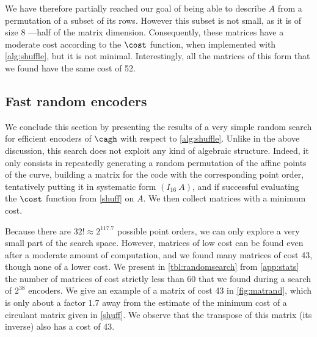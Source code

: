 We have therefore partially reached our goal of being able to describe $A$ from a permutation of a subset of its rows. However this subset
is not small, as it is of size 8 ---half
of the matrix dimension. Consequently, these matrices have a moderate cost according to the $\cost$ function, when implemented with \autoref{alg:shuffle}, but it is not minimal. Interestingly, all the matrices of this form
that we found have the same cost of 52.

\subsection{Fast random encoders}

We conclude this section by presenting the results of a very simple random search for efficient encoders of $\cagh$ with respect to \autoref{alg:shuffle}. Unlike
in the above discussion, this search does not exploit any kind of algebraic structure.
Indeed, it only consists in repeatedly generating a random permutation of the affine points of the curve, building
a matrix for the code with the corresponding point order, tentatively putting it in systematic form $(I_{16}~A)$, and if successful evaluating
the $\cost$ function from \autoref{shuff} on $A$. We then collect matrices with a minimum cost.

Because there are $32! \approx 2^{117.7}$ possible point orders, we can only explore a very small part of the search space. However,
matrices of low cost can be found even after a moderate amount of computation, and we found many matrices of
cost 43, though none of a lower cost. We present in \autoref{tbl:randomsearch} from \autoref{app:stats} the number of matrices of cost strictly less than 60
that we found during a search of $2^{38}$ encoders.
We give an example of a matrix of cost 43 in \autoref{fig:matrand}, which is only about a factor 1.7 away from the estimate of the minimum cost of a circulant matrix
given in \autoref{shuff}. We observe that the transpose of this matrix (its inverse) also has a cost of 43.
